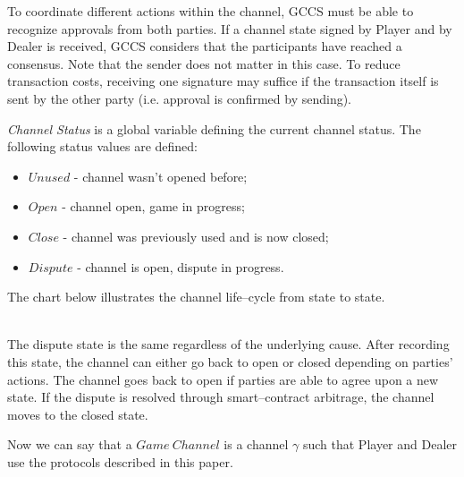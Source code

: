 To coordinate different actions within the channel, GCCS must be able to recognize approvals from both parties. If a channel state signed by Player and by Dealer is received, GCCS considers that the participants have reached a consensus. Note that the sender does not matter in this case. To reduce transaction costs, receiving one signature may suffice if the transaction itself is sent by the other party (i.e. approval is confirmed by sending).  

\textit {Channel Status} is a global variable defining the current channel status. The following status values are defined:
\begin{itemize}
	\item $Unused$ - channel wasn't opened before;
	\item $Open$ - channel open, game in progress;
	\item $Close$ - channel was previously used and is now closed;
	\item $Dispute$ - channel is open, dispute in progress.
\end{itemize}

The chart below illustrates the channel life--cycle from state to state.
\\
\\
\begin{center}
\end{center}

The dispute state is the same regardless of the underlying cause. After recording this state, the channel can either go back to open or closed depending on parties' actions. The channel goes back to open if parties are able to agree upon a new state. If the dispute is resolved through smart--contract arbitrage, the channel moves to the closed state.

Now we can say that a $ Game \ Channel $ is a channel $\gamma$ such that Player and Dealer use the protocols described in this paper. 

